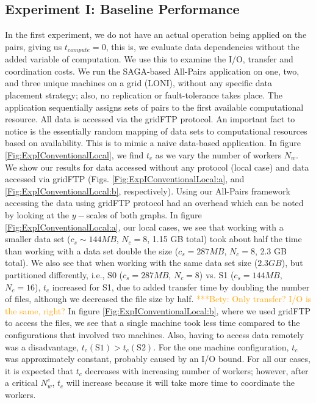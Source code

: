 \documentclass{rspublic}
\newcommand{\betynote}[1]{ {\textcolor{orange} { ***Bety: #1 }}}
\begin{document}
\subsection{Experiment I: Baseline Performance}
In the first experiment, we do not have an actual operation being
applied on the pairs, giving us $t_{compute}=0$, this is, we evaluate
data dependencies without the added variable of computation. We use
this to examine the I/O, transfer and coordination costs. We run the
SAGA-based All-Pairs application on one, two, and three unique machines
on a grid (LONI), without any specific data placement strategy; also,
no replication or fault-tolerance takes place. The application
sequentially assigns sets of pairs to the first available computational
resource. All data is accessed via the gridFTP protocol.  An important
fact to notice is the essentially random mapping of data sets to
computational resources based on availability. This is to mimic a naive
data-based application. In figure \ref{Fig:ExpIConventionalLocal}, we
find $t_c$ as we vary the number of workers $N_w$. We show our results
for data accessed without any protocol (local case) and data accessed
via gridFTP (Figs. \ref{Fig:ExpIConventionalLocal:a}, and
\ref{Fig:ExpIConventionalLocal:b}, respectively). Using our All-Pairs
framework accessing the data using gridFTP protocol had an overhead
which can be noted by looking at the $y-$scales of both graphs. In figure
\ref{Fig:ExpIConventionalLocal:a}, our local cases, we see that working
with a smaller data set ($c_s \sim 144MB$, $N_c = 8$, 1.15 GB total)
took about half the time than working with a data set double the size
($c_s = 287MB$, $N_c = 8$, 2.3 GB total). We also see that when working
with the same data set size ($2.3 GB$), but partitioned differently,
i.e., S0 ($c_s = 287MB$, $N_c = 8$) vs. S1 ($c_s = 144MB$, $N_c = 16$),
$t_c$ increased for S1, due to added transfer time by doubling the
number of files, although we decreased the file size by half.
\betynote{Only transfer? I/O is the same, right?}In figure
\ref{Fig:ExpIConventionalLocal:b}, where we used gridFTP to access the
files, we see that a single machine took less time compared to the
configurations that involved two machines. Also, having to access data
remotely was a disadvantage, $t_c(\mbox{S1}) > t_c(\mbox{S2})$. For the
one machine configuration, $t_c$ was approximately constant, probably
caused by an I/O bound. For all our cases, it is expected that $t_c$
decreases with increasing number of workers; however, after a critical
$N^c_w$, $t_c$ will increase because it will take more time to
coordinate the workers.
\end{document}
